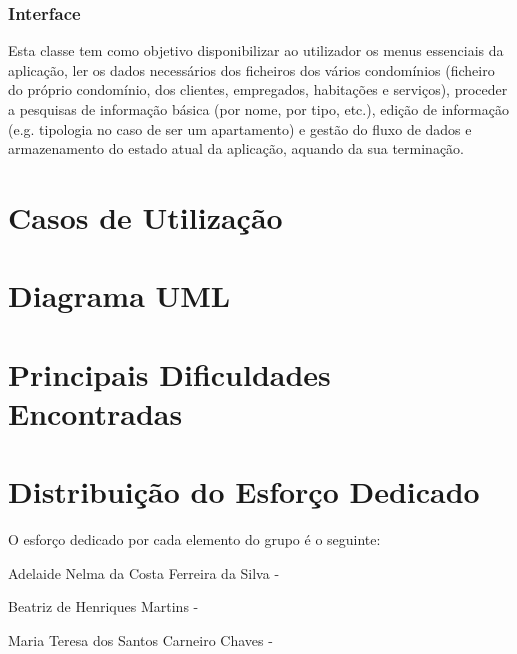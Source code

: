 \documentclass[a4paper]{article}
\begin{document}
\subsubsection{Interface}

Esta classe tem como objetivo disponibilizar ao utilizador os menus essenciais da aplicação, ler os dados necessários dos ficheiros dos vários condomínios (ficheiro do próprio condomínio, dos clientes, empregados, habitações e serviços), proceder a pesquisas de informação básica (por nome, por tipo, etc.), edição de informação (e.g. tipologia no caso de ser um apartamento) e gestão do fluxo de dados e armazenamento do estado atual da aplicação, aquando da sua terminação.

\newpage

\section{Casos de Utilização}


\newpage

\section{Diagrama UML}

\newpage

\section{Principais Dificuldades Encontradas}


\newpage

\section{Distribuição do Esforço Dedicado}

O esforço dedicado por cada elemento do grupo é o seguinte: \newline

Adelaide Nelma da Costa Ferreira da Silva - \newline

Beatriz de Henriques Martins - \newline

Maria Teresa dos Santos Carneiro Chaves - 

\newpage
\end{document}
